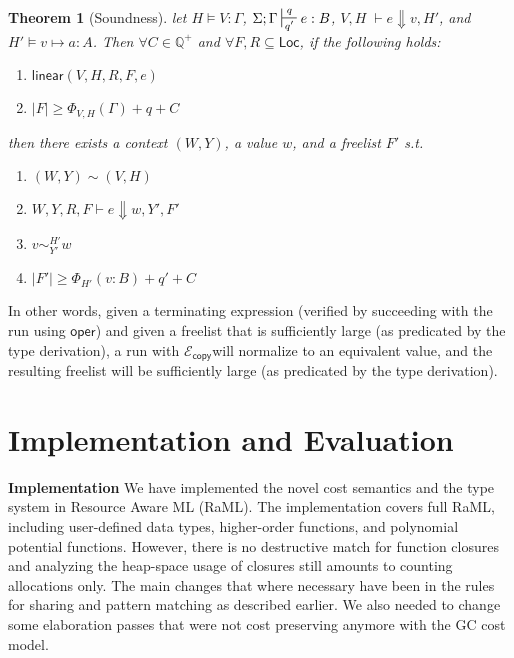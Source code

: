 \documentclass{easychair}
\newtheorem{theorem}{Theorem}
\newcommand{\ms}[1]{\ensuremath{\mathsf{#1}}}
\newcounter{rule}
\newcommand{\wfc}[5]{\mathsf{linear}(#1,#2,#3,#4,#5)}
\newcommand{\veq}[4]{#3 \sim^{#1}_{#2} #4}
\newcommand{\ctxeq}[2]{(#1) \sim (#2)}
\newcommand{\copySem}{\ensuremath{\mathcal{E}_{\ms{copy}}}}
\theoremstyle{definition}
\begin{document}
\begin{theorem}[Soundness]
\label{itm:soundness} let $H \vDash V : \Gamma$, $\Sigma; \Gamma \sststile{q'}{q} e : B$,
$V,H \; \vdash e \Downarrow v, H'$, and $H' \vDash v \mapsto a : A$.
Then $\forall C \in \mathbb{Q}^{+}$ and $\forall F,R \subseteq \ms{Loc}$,
if the following holds:
\begin{enumerate} 
\item $\wfc{V}{H}{R}{F}{e}$
\item $|F| \ge \Phi_{V,H}(\Gamma) + q + C$ 
\end{enumerate}
then there exists a context $(W,Y)$, a value $w$, and a freelist $F'$ s.t.
\begin{enumerate}
	\item $\ctxeq{W,Y}{V,H}$
  \item $W,Y,R,F \vdash e \Downarrow w, Y', F'$
	\item $\veq{H'}{Y'}{v}{w}$
  \item $|F'| \ge \Phi_{H'}(v:B) + q' + C$
\end{enumerate}
\end{theorem}

In other words, given a terminating expression (verified by succeeding with the run using \ms{oper})
and given a freelist that is sufficiently large (as predicated by the type derivation), 
a run with \copySem will normalize to an equivalent value, and the resulting freelist 
will be sufficiently large (as predicated by the type derivation).






\section{Implementation and Evaluation}
\label{sect:implementation}

{\bf Implementation}
We have implemented the novel cost semantics and the type system in
Resource Aware ML (RaML). The implementation covers full RaML,
including user-defined data types, higher-order functions, and
polynomial potential functions. However, there is no destructive match
for function closures and analyzing the heap-space usage of closures
still amounts to counting allocations only. The main changes that
where necessary have been in the rules for sharing and pattern
matching as described earlier. We also needed to change some
elaboration passes that were not cost preserving anymore with
the GC cost model.
\end{document}
